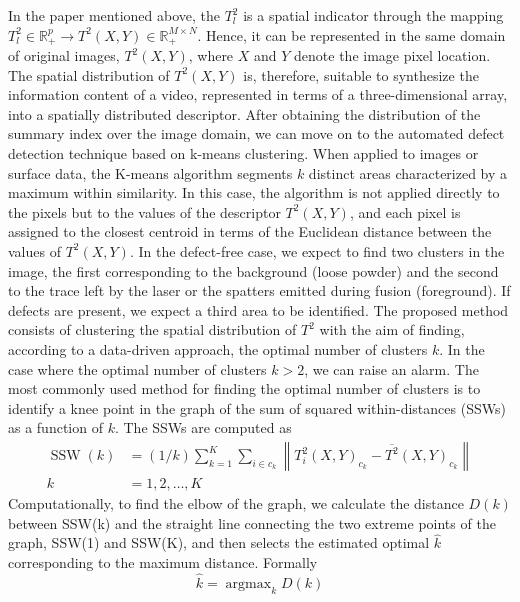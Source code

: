 In the paper mentioned above, the $T_l^2$ is a spatial indicator through the mapping $T_l^2 \in \mathbb{R}_{+}^p \rightarrow T^2(X, Y) \in \mathbb{R}_{+}^{M \times N}$. Hence, it can be represented in the same domain of original images, $T^2(X, Y)$, where $X$ and $Y$ denote the image pixel location. The spatial distribution of $T^2(X, Y)$ is, therefore, suitable to synthesize the information content of a video, represented in terms of a three-dimensional array, into a spatially distributed descriptor. After obtaining the distribution of the summary index over the image domain, we can move on to the automated defect detection technique based on k-means clustering. When applied to images or surface data, the K-means algorithm segments $k$ distinct areas characterized by a maximum within similarity. In this case, the algorithm is not applied directly to the pixels but to the values of the descriptor $T^2(X, Y)$, and each pixel is assigned to the closest centroid in terms of the Euclidean distance between the values of $T^2(X, Y)$. In the defect-free case, we expect to find two clusters in the image, the first corresponding to the background (loose powder) and the second to the trace left by the laser or the spatters emitted during fusion (foreground). If defects are present, we expect a third area to be identified. The proposed method consists of clustering the spatial distribution of $T^2$ with the aim of finding, according to a data-driven approach, the optimal number of clusters $k$. In the case where the optimal number of clusters $k>2$, we can raise an alarm. The most commonly used method for finding the optimal number of clusters is to identify a knee point in the graph of the sum of squared within-distances (SSWs) as a function of $k$. The SSWs are computed as 
\begin{equation}
\begin{aligned}
\operatorname{SSW}(k) & =(1 / k) \sum_{k=1}^K \sum_{i \in c_k}\left\|T_i^2(X, Y)_{c_k}-\overline{T^2}(X, Y)_{c_k}\right\| \\
k & =1,2, \ldots, K
\end{aligned}
\end{equation}
Computationally, to find the elbow of the graph, we calculate the distance $D(k)$ between SSW(k) and the straight line connecting the two extreme points of the graph, SSW(1) and SSW(K), and then selects the estimated optimal $\hat{k}$ corresponding to the maximum distance. Formally
\begin{equation}
\hat{k}=\operatorname{argmax}_k D(k)
\end{equation}
